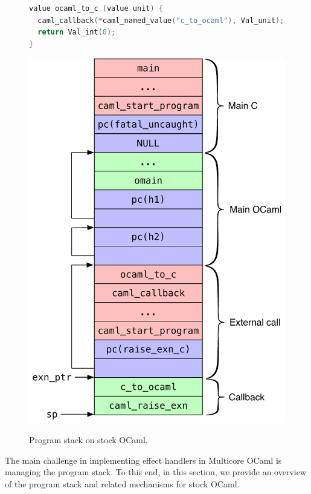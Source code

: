 \documentclass[sigplan,10pt,review,anonymous]{acmart}\settopmatter{printfolios=true,printccs=false,printacmref=false}
\begin{document}
\begin{figure}
\begin{minipage}{0.59\linewidth}
\begin{minipage}{\linewidth}
\begin{lstlisting}[language=c]
value ocaml_to_c (value unit) {
  caml_callback(*caml_named_value("c_to_ocaml"), Val_unit);
  return Val_int(0);
}
		\end{lstlisting}
    \label{code:meander_c}
	\end{minipage}
\end{minipage}
	\begin{minipage}{0.39\linewidth}
    \centering
    \includegraphics[scale=0.46]{figures/stock_stack}
    \label{fig:stock_stack}
  \end{minipage}
	\caption{Program stack on stock OCaml.}
\end{figure}

The main challenge in implementing effect handlers in Multicore OCaml is
managing the program stack. To this end, in this section, we provide an
overview of the program stack and related mechanisms for stock OCaml.
\end{document}
